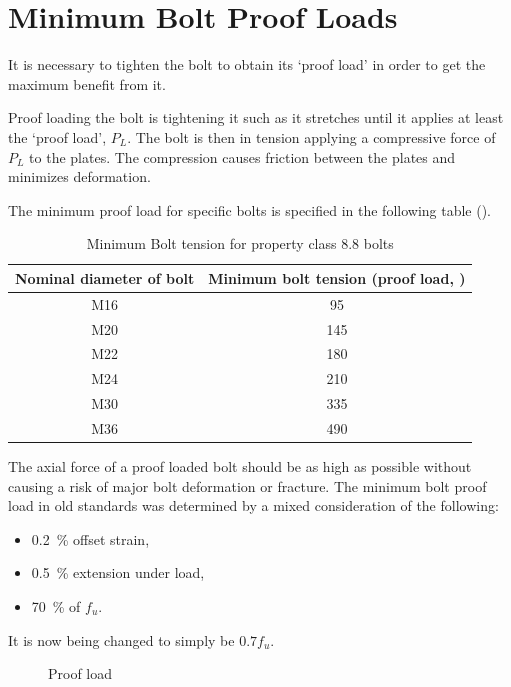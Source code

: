 \section{Minimum Bolt Proof Loads}
It is necessary to tighten the bolt to obtain its `proof load' in order to get the maximum benefit from it.

Proof loading the bolt is tightening it such as it stretches until it applies at least the `proof load', $P_L$. The bolt is then in tension applying a compressive force of $P_L$ to the plates. The compression causes friction between the plates and minimizes deformation.

The minimum proof load for specific bolts is specified in the following table ().
\begin{table}[H]\centering\footnotesize\caption{Minimum Bolt tension for property class 8.8 bolts}
\begin{tabular}{cc}
	\toprule
	Nominal diameter of bolt & Minimum bolt tension (proof load, \si{\kn}) \\ \midrule
	          M16            &                     95                      \\
	          M20            &                     145                     \\
	          M22            &                     180                     \\
	          M24            &                     210                     \\
	          M30            &                     335                     \\
	          M36            &                     490                     \\ \bottomrule
\end{tabular}
\end{table}
The axial force of a proof loaded bolt should be as high as possible without causing a risk of major bolt deformation or fracture. The minimum bolt proof load in old standards was determined by a mixed consideration of the following:
\begin{itemize}
\item \SI{0.2}{\percent} offset strain,
\item \SI{0.5}{\percent} extension under load,
\item \SI{70}{\percent} of $f_u$.
\end{itemize}
It is now being changed to simply be $0.7f_u$.
\begin{figure}[H]
\centering
\caption{Proof load}
\end{figure}
